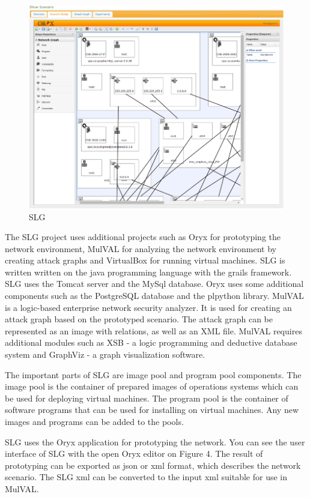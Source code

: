 \begin{figure}[ht!]
\centering
\includegraphics[width=\textwidth]{slg.png}
\caption{SLG}
\label{overflow}
\end{figure} 

The SLG project uses additional projects such as Oryx for prototyping the network environment, MulVAL for analyzing the network environment by creating attack graphs and VirtualBox for running virtual machines. SLG is written written on the java programming language with the grails framework. SLG uses the Tomcat server and the MySql database. Oryx uses some additional components such as the PostgreSQL database and the plpython library. MulVAL is a logic-based enterprise network security analyzer. It is used for creating an attack graph based on the prototyped scenario. The attack graph can be represented as an image with relations, as well as an XML file. MulVAL requires additional modules such as XSB - a logic programming and deductive database system and GraphViz - a graph visualization software. 

The important parts of SLG are image pool and program pool components. The image pool is the container of prepared images of operations systems which can be used for deploying virtual machines. The program pool is the container of software programs that can be used for installing on virtual machines. Any new images and programs can be added to the pools.

SLG uses the Oryx application for prototyping the network. You can see the user interface of SLG with the open Oryx editor on Figure 4. The result of prototyping can be exported as json or xml format, which describes the network scenario. The SLG xml can be converted to the input xml suitable for use in MulVAL. 

